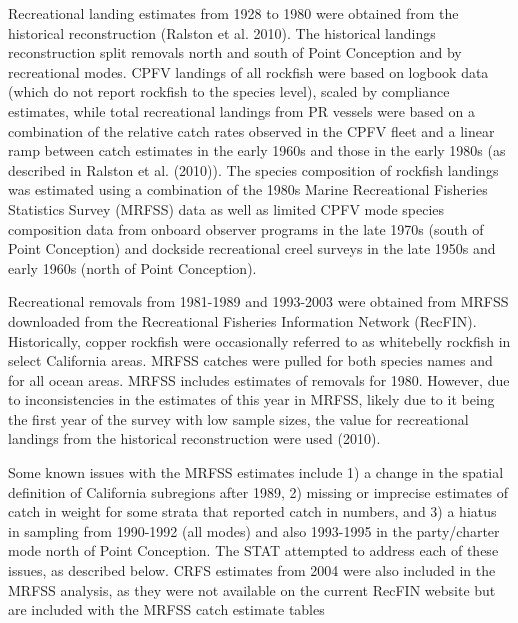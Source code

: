 \documentclass[11pt,
  english,
  letterpaper,
]{article}
\begin{document}
Recreational landing estimates from 1928 to 1980 were obtained from the historical reconstruction (Ralston et al. 2010). The historical landings reconstruction split removals north and south of Point Conception and by recreational modes. CPFV landings of all rockfish were based on logbook data (which do not report rockfish to the species level), scaled by compliance estimates, while total recreational landings from PR vessels were based on a combination of the relative catch rates observed in the CPFV fleet and a linear ramp between catch estimates in the early 1960s and those in the early 1980s (as described in Ralston et al. (2010)). The species composition of rockfish landings was estimated using a combination of the 1980s Marine Recreational Fisheries Statistics Survey (MRFSS) data as well as limited CPFV mode species composition data from onboard observer programs in the late 1970s (south of Point Conception) and dockside recreational creel surveys in the late 1950s and early 1960s (north of Point Conception).

Recreational removals from 1981-1989 and 1993-2003 were obtained from MRFSS downloaded from the Recreational Fisheries Information Network (RecFIN). Historically, copper rockfish were occasionally referred to as whitebelly rockfish in select California areas. MRFSS catches were pulled for both species names and for all ocean areas. MRFSS includes estimates of removals for 1980. However, due to inconsistencies in the estimates of this year in MRFSS, likely due to it being the first year of the survey with low sample sizes, the value for recreational landings from the historical reconstruction were used (2010).

Some known issues with the MRFSS estimates include 1) a change in the spatial definition of California subregions after 1989, 2) missing or imprecise estimates of catch in weight for some strata that reported catch in numbers, and 3) a hiatus in sampling from 1990-1992 (all modes) and also 1993-1995 in the party/charter mode north of Point Conception. The STAT attempted to address each of these issues, as described below. CRFS estimates from 2004 were also included in the MRFSS analysis, as they were not available on the current RecFIN website but are included with the MRFSS catch estimate tables
\end{document}
